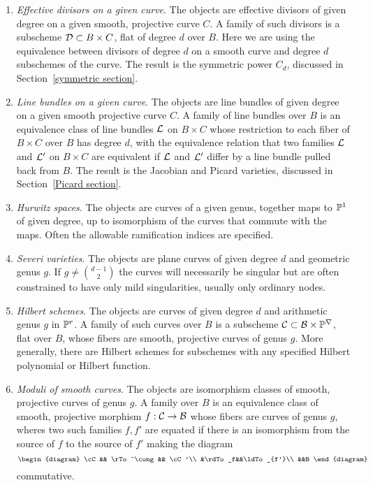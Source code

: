\begin{enumerate}\label{list of moduli problems}

\item \emph{Effective divisors on a given curve}. The objects are effective divisors of given degree on a given smooth, projective curve $C$. A family of such divisors is a subscheme ${\cal D} \subset B \times C$, flat of degree $d$ over $B$. 
Here we are using
the equivalence between divisors of degree $d$ on a smooth curve and degree $d$ subschemes of the curve. The result is the symmetric power $C_d$, discussed in Section~\ref{symmetric section}.

\item \emph{Line bundles on a given curve}. The objects are line bundles of given degree on a given smooth projective curve $C$. A family of line bundles over $B$ is an equivalence class of line bundles ${\mathcal L}$ on $B \times C$ whose restriction to each fiber of $B \times C$ over $B$ has degree $d$, with the equivalence relation that two families ${\mathcal L}$ and ${\mathcal L}'$ on $B \times C$ are equivalent if ${\mathcal L}$ and ${\mathcal L}'$ differ by a line
bundle pulled back from $B$. 
The result is the Jacobian and Picard varieties, discussed in Section~\ref{Picard section}.

\item \emph{Hurwitz spaces}. The objects are curves of a given genus, together maps to ${\mathbb P}^1$ of given degree, up to isomorphism of the curves that commute with the maps. Often the allowable ramification indices are specified.

\item \emph{Severi varieties}. The objects are plane curves
of given degree $d$ and geometric genus $g$. If $g \neq {d-1\choose 2}$
the curves will necessarily be singular but are often
constrained to have only mild singularities, usually only ordinary nodes.

\item \emph{Hilbert schemes}. The objects are curves of given degree $d$ and arithmetic genus $g$ in ${\mathbb P}^r$.  A family of such curves over $B$ is a subscheme $\cal C \subset B \times {\mathbb P}^r$, flat over $B$,  whose fibers are smooth, projective curves of genus $g$. More generally, there are Hilbert schemes
for subschemes with any specified Hilbert polynomial or Hilbert function.

\item \emph{Moduli of smooth curves}. The objects are isomorphism classes of smooth, projective curves of genus $g$. A family over $B$ is an equivalence class of smooth, projective morphism $f : \cal C \to B$ whose fibers are curves of genus $g$, wheres two such families $f, f'$
are equated if there is an isomorphism from the source of $f$ to the source
of $f'$ making the diagram
$$
\begin{diagram}
\cC && \rTo^\cong && \cC'\\
&\rdTo_f&&\ldTo_{f'}\\
&&B
\end{diagram}
$$
commutative.
\end{enumerate}


